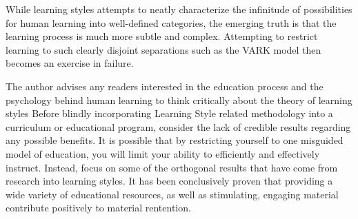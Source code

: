\documentclass[12pt]{report}
\begin{document}
While learning styles attempts to neatly characterize the infinitude of
possibilities for human learning into well-defined categories, the emerging
truth is that the learning process is much more subtle and complex.
Attempting to restrict learning to such clearly disjoint separations such as
the VARK model then becomes an exercise in failure.

The author advises any readers interested in the education process and the
psychology behind human learning to think critically about the theory of
learning styles Before blindly incorporating Learning Style related
methodology into a curriculum or educational program, consider the lack of
credible results regarding any possible benefits. It is possible that by
restricting yourself to one misguided model of education, you will limit
your ability to efficiently and effectively instruct. Instead, focus on some
of the orthogonal results that have come from research into learning styles.
It has been conclusively proven that providing a wide variety of educational
resources, as well as stimulating, engaging material contribute positively
to material rentention.


\end{document}
